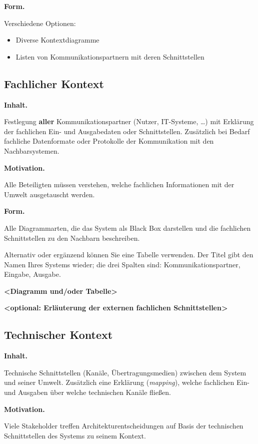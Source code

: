 \documentclass[]{article}
\begin{document}
\textbf{Form.}

Verschiedene Optionen:

\begin{itemize}
\item
  Diverse Kontextdiagramme
\item
  Listen von Kommunikationspartnern mit deren Schnittstellen
\end{itemize}

\subsection{Fachlicher Kontext}\label{_fachlicher_kontext}

\textbf{Inhalt.}

Festlegung \textbf{aller} Kommunikationspartner (Nutzer, IT-Systeme,
\ldots{}) mit Erklärung der fachlichen Ein- und Ausgabedaten oder
Schnittstellen. Zusätzlich bei Bedarf fachliche Datenformate oder
Protokolle der Kommunikation mit den Nachbarsystemen.

\textbf{Motivation.}

Alle Beteiligten müssen verstehen, welche fachlichen Informationen mit
der Umwelt ausgetauscht werden.

\textbf{Form.}

Alle Diagrammarten, die das System als Black Box darstellen und die
fachlichen Schnittstellen zu den Nachbarn beschreiben.

Alternativ oder ergänzend können Sie eine Tabelle verwenden. Der Titel
gibt den Namen Ihres Systems wieder; die drei Spalten sind:
Kommunikationspartner, Eingabe, Ausgabe.

\textbf{\textless{}Diagramm und/oder Tabelle\textgreater{}}

\textbf{\textless{}optional: Erläuterung der externen fachlichen
Schnittstellen\textgreater{}}

\subsection{Technischer Kontext}\label{_technischer_kontext}

\textbf{Inhalt.}

Technische Schnittstellen (Kanäle, Übertragungsmedien) zwischen dem
System und seiner Umwelt. Zusätzlich eine Erklärung (\emph{mapping}),
welche fachlichen Ein- und Ausgaben über welche technischen Kanäle
fließen.

\textbf{Motivation.}

Viele Stakeholder treffen Architekturentscheidungen auf Basis der
technischen Schnittstellen des Systems zu seinem Kontext.
\end{document}
